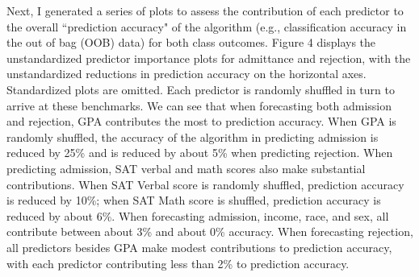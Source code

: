 \documentclass[titlepage]{article}   	%
\begin{document}
Next, I generated a series of plots to assess the contribution of each predictor to the overall “prediction accuracy" of the algorithm (e.g., classification accuracy in the out of bag (OOB) data) for both class outcomes. Figure 4 displays the unstandardized predictor importance plots for admittance and rejection, with the unstandardized reductions in prediction accuracy on the horizontal axes. Standardized plots are omitted. Each predictor is randomly shuffled in turn to arrive at these benchmarks. We can see that when forecasting both admission and rejection, GPA contributes the most to prediction accuracy. When GPA is randomly shuffled, the accuracy of the algorithm in predicting admission is reduced by 25\% and is reduced by about 5\% when predicting rejection. When predicting admission, SAT verbal and math scores also make substantial contributions. When SAT Verbal score is randomly shuffled, prediction accuracy is reduced by 10\%; when SAT Math score is shuffled, prediction accuracy is reduced by about 6\%. When forecasting admission, income, race, and sex, all contribute between about 3\% and about 0\% accuracy. When forecasting rejection, all predictors besides GPA make modest contributions to prediction accuracy, with each predictor contributing less than 2\% to prediction accuracy.
\end{document}
